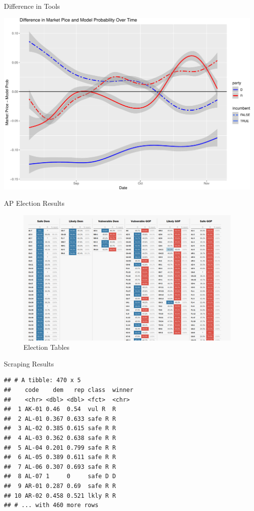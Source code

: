\documentclass[ignorenonframetext,]{beamer}
\begin{document}
\begin{frame}{Difference in Tools}

\includegraphics{markets_models_files/figure-beamer/diff-1.pdf}

\end{frame}

\begin{frame}{AP Election Results}

\begin{figure}
\centering
\includegraphics{election_table.png}
\caption{Election Tables}
\end{figure}

\end{frame}

\begin{frame}[fragile]{Scraping Results}

\begin{verbatim}
## # A tibble: 470 x 5
##    code    dem   rep class  winner
##    <chr> <dbl> <dbl> <fct>  <chr> 
##  1 AK-01 0.46  0.54  vul R  R     
##  2 AL-01 0.367 0.633 safe R R     
##  3 AL-02 0.385 0.615 safe R R     
##  4 AL-03 0.362 0.638 safe R R     
##  5 AL-04 0.201 0.799 safe R R     
##  6 AL-05 0.389 0.611 safe R R     
##  7 AL-06 0.307 0.693 safe R R     
##  8 AL-07 1     0     safe D D     
##  9 AR-01 0.287 0.69  safe R R     
## 10 AR-02 0.458 0.521 lkly R R     
## # ... with 460 more rows
\end{verbatim}

\end{frame}
\end{document}
